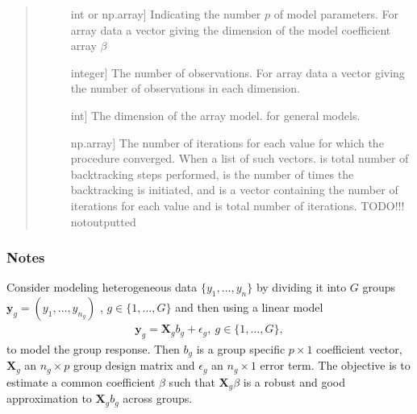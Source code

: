 \documentclass[letterpaper,10pt,english]{sphinxmanual}
\begin{document}
\begin{fulllineitems}
\begin{quote}
\begin{description}
\begin{description}
\item[{}] \leavevmode{[}int or np.array{]}
\sphinxAtStartPar
Indicating the number \(p\) of model parameters.
For array data a vector giving the dimension of the model coefficient array \(\beta\)

\item[{}] \leavevmode{[}integer{]}
\sphinxAtStartPar
The number of observations. For array data a vector giving the number of  observations in each dimension.

\item[{}] \leavevmode{[}int{]}
\sphinxAtStartPar
The dimension of the array model.  for general models.

\item[{}] \leavevmode{[}np.array{]}
\sphinxAtStartPar
The  number of  iterations for each  value for which the procedure converged. When
 a   \sphinxhyphen{}list of such vectors.   is total 
number of backtracking steps performed,
 is the number of times the backtracking is initiated,
and    is a vector containing the  number of  iterations for each
 value and     is total number of iterations. TODO!!! notoutputted

\end{description}

\end{description}\end{quote}
\subsubsection*{Notes}

\sphinxAtStartPar
Consider modeling heterogeneous data \(\{y_1,\ldots, y_n\}\) by dividing
it into \(G\) groups \(\mathbf{y}_g = (y_1, \ldots, y_{n_g})\) ,
\(g \in \{ 1,\ldots, G\}\) and then using a linear model
\begin{equation*}
\begin{split}\mathbf{y}_g = \mathbf{X}_gb_g + \epsilon_g, \  g \in \{1,\ldots, G\},\end{split}
\end{equation*}
\sphinxAtStartPar
to model the group response. Then \(b_g\) is a group specific \(p\times 1\)
coefficient vector, \(\mathbf{X}_g\) an \(n_g\times p\) group design matrix and
\(\epsilon_g\) an \(n_g\times 1\) error term. The objective is to estimate
a common coefficient \(\beta\) such that \(\mathbf{X}_g\beta\) is a robust
and good approximation to \(\mathbf{X}_gb_g\) across groups.


\end{fulllineitems}
\end{document}
